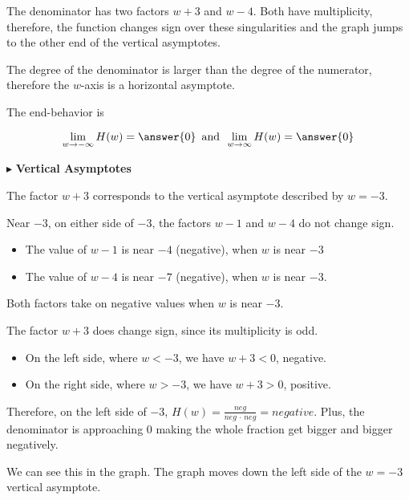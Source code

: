 \documentclass{ximera}
\begin{document}
\begin{example}
The denominator has two factors $w+3$ and $w-4$.  Both have   multiplicity, therefore, the function changes sign over these singularities and the graph jumps to the other end of the vertical asymptotes.


The degree of the denominator is larger than the degree of the numerator, therefore the $w$-axis is a horizontal asymptote.



The end-behavior is



\[       \lim_{w \to -\infty} H(w) = \answer{0}   \, \text{ and } \,    \lim_{w \to \infty} H(w) = \answer{0}               \]





$\blacktriangleright$ \textbf{Vertical Asymptotes} 





The factor $w+3$ corresponds to the vertical asymptote described by $w = -3$.


Near $-3$, on either side of $-3$, the factors $w-1$ and $w-4$ do not change sign. 



\begin{itemize}
\item The value of $w-1$ is near $-4$ (negative), when $w$ is near $-3$
\item The value of $w-4$ is near $-7$ (negative), when $w$ is near $-3$.
\end{itemize}

Both factors take on negative values when $w$ is near $-3$.

The factor $w+3$ does change sign, since its multiplicity is odd.

\begin{itemize}
\item On the left side, where $w < -3$, we have $w+3<0$, negative.
\item On the right side, where $w > -3$, we have $w+3>0$, positive.
\end{itemize}


Therefore, on the left side of $-3$, $H(w) = \frac{neg}{neg \, \cdot \, neg} = negative$.  Plus, the denominator is approaching $0$ making the whole fraction get bigger and bigger negatively.

We can see this in the graph.  The graph moves down the left side of the $w=-3$ vertical asymptote.


\end{example}
\end{document}

